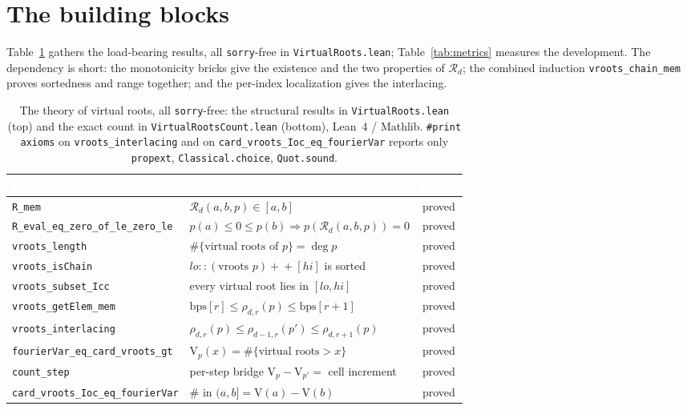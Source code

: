 \documentclass[11pt]{article}
\newcommand{\lean}[1]{\texttt{#1}}
\newcommand{\V}{\mathrm{V}}
\newcommand{\Rd}{\mathcal{R}}
\begin{document}
\section{The building blocks}\label{sec:blocks}

Table~\ref{tab:results} gathers the load-bearing results, all \lean{sorry}-free in
\lean{VirtualRoots.lean}; Table~\ref{tab:metrics} measures the development. The dependency is short:
the monotonicity bricks give the existence and the two properties of $\Rd_d$; the combined induction
\lean{vroots\_chain\_mem} proves sortedness and range together; and the per-index localization gives
the interlacing.

\begin{table}[H]
  \centering\footnotesize
  \begin{tabular}{@{}llc@{}}
    \toprule
    \rowcolor{ggteal}
    \textcolor{white}{\textbf{Lean name}} & \textcolor{white}{\textbf{Statement}} & \textcolor{white}{\textbf{Status}} \\
    \midrule
    \rowcolor{ggband}
    \lean{R\_mem} & $\Rd_d(a,b,p)\in[a,b]$ & proved \\
    \lean{R\_eval\_eq\_zero\_of\_le\_zero\_le} & $p(a)\!\le\!0\!\le\!p(b)\Rightarrow p(\Rd_d(a,b,p))=0$ & proved \\
    \rowcolor{ggband}
    \lean{vroots\_length} & $\#\{\text{virtual roots of }p\}=\deg p$ & proved \\
    \lean{vroots\_isChain} & $lo::(\text{vroots }p)+\!\!+[hi]$ is sorted & proved \\
    \rowcolor{ggband}
    \lean{vroots\_subset\_Icc} & every virtual root lies in $[lo,hi]$ & proved \\
    \lean{vroots\_getElem\_mem} & $\mathrm{bps}[r]\le\rho_{d,r}(p)\le\mathrm{bps}[r{+}1]$ & proved \\
    \rowcolor{ggband}
    \lean{vroots\_interlacing} & $\rho_{d,r}(p)\le\rho_{d-1,r}(p')\le\rho_{d,r+1}(p)$ & proved \\
    \midrule
    \lean{fourierVar\_eq\_card\_vroots\_gt} & $\V_p(x)=\#\{\text{virtual roots}>x\}$ & proved \\
    \rowcolor{ggband}
    \lean{count\_step} & per-step bridge $\V_p{-}\V_{p'}=$ cell increment & proved \\
    \lean{card\_vroots\_Ioc\_eq\_fourierVar} & $\#$ in $(a,b]=\V(a)-\V(b)$ & proved \\
    \bottomrule
  \end{tabular}
  \caption{The theory of virtual roots, all \lean{sorry}-free: the structural results in
  \lean{VirtualRoots.lean} (top) and the exact count in \lean{VirtualRootsCount.lean} (bottom), Lean~4
  / Mathlib. \lean{\#print axioms} on \lean{vroots\_interlacing} and on
  \lean{card\_vroots\_Ioc\_eq\_fourierVar} reports only \lean{propext}, \lean{Classical.choice},
  \lean{Quot.sound}.}
  \label{tab:results}
\end{table}
\end{document}
